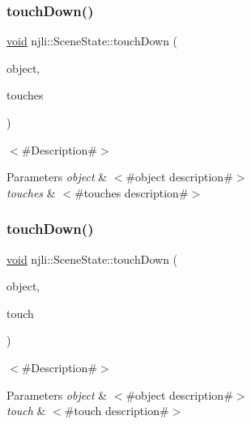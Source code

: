 \subsubsection{\texorpdfstring{touch\+Down()}{touchDown()}\hspace{0.1cm}{\footnotesize\ttfamily [1/2]}}
{\footnotesize\ttfamily \mbox{\hyperlink{_thread_8h_af1e856da2e658414cb2456cb6f7ebc66}{void}} njli\+::\+Scene\+State\+::touch\+Down (\begin{DoxyParamCaption}\item[{\mbox{\hyperlink{classnjli_1_1_scene}{Scene}} $\ast$}]{object,  }\item[{\mbox{\hyperlink{classnjli_1_1_device_touch}{Device\+Touch}} $\ast$$\ast$}]{touches }\end{DoxyParamCaption})}

$<$\#\+Description\#$>$


\begin{DoxyParams}{Parameters}
{\em object} & $<$\#object description\#$>$ \\
\hline
{\em touches} & $<$\#touches description\#$>$ \\
\hline
\end{DoxyParams}
\mbox{\label{classnjli_1_1_scene_state_a091f6ee2bbc0f250362a17177b108300}} 
\subsubsection{\texorpdfstring{touch\+Down()}{touchDown()}\hspace{0.1cm}{\footnotesize\ttfamily [2/2]}}
{\footnotesize\ttfamily \mbox{\hyperlink{_thread_8h_af1e856da2e658414cb2456cb6f7ebc66}{void}} njli\+::\+Scene\+State\+::touch\+Down (\begin{DoxyParamCaption}\item[{\mbox{\hyperlink{classnjli_1_1_scene}{Scene}} $\ast$}]{object,  }\item[{const \mbox{\hyperlink{classnjli_1_1_device_touch}{Device\+Touch}} \&}]{touch }\end{DoxyParamCaption})}

$<$\#\+Description\#$>$


\begin{DoxyParams}{Parameters}
{\em object} & $<$\#object description\#$>$ \\
\hline
{\em touch} & $<$\#touch description\#$>$ \\
\hline
\end{DoxyParams}
\mbox{\label{classnjli_1_1_scene_state_a9066440c12710e56d460f3ba64e73b00}} 
